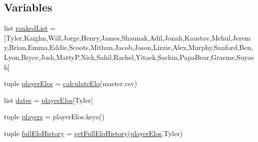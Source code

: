 \subsection*{Variables}
\begin{DoxyCompactItemize}
\item 
list \hyperlink{namespacebump__util_1_1elo_1_1elo__util_ab17f3f7dc79c0595109f66423f82f9e9}{ranked\+List} = \mbox{[}\textquotesingle{}Tyler\textquotesingle{},\textquotesingle{}Kaighn\textquotesingle{},\textquotesingle{}Will\textquotesingle{},\textquotesingle{}Jorge\textquotesingle{},\textquotesingle{}Henry\textquotesingle{},\textquotesingle{}James\textquotesingle{},\textquotesingle{}Shaunak\textquotesingle{},\textquotesingle{}Adil\textquotesingle{},\textquotesingle{}Jonah\textquotesingle{},\textquotesingle{}Kaustav\textquotesingle{},\textquotesingle{}Mehul\textquotesingle{},\textquotesingle{}Jeremy\textquotesingle{},\textquotesingle{}Brian\textquotesingle{},\textquotesingle{}Emma\textquotesingle{},\textquotesingle{}Eddie\textquotesingle{},\textquotesingle{}Scoots\textquotesingle{},\textquotesingle{}Mithun\textquotesingle{},\textquotesingle{}Jacob\textquotesingle{},\textquotesingle{}Jason\textquotesingle{},\textquotesingle{}Lizzie\textquotesingle{},\textquotesingle{}Alex\textquotesingle{},\textquotesingle{}Murphy\textquotesingle{},\textquotesingle{}Sanford\textquotesingle{},\textquotesingle{}Ben\textquotesingle{},\textquotesingle{}Lyon\textquotesingle{},\textquotesingle{}Bryce\textquotesingle{},\textquotesingle{}Josh\textquotesingle{},\textquotesingle{}Matty\+P\textquotesingle{},\textquotesingle{}Nick\textquotesingle{},\textquotesingle{}Sahil\textquotesingle{},\textquotesingle{}Rachel\textquotesingle{},\textquotesingle{}Yitaek\textquotesingle{},\textquotesingle{}Sachin\textquotesingle{},\textquotesingle{}Papa\+Bear\textquotesingle{},\textquotesingle{}Graeme\textquotesingle{},\textquotesingle{}Suyash\textquotesingle{}\mbox{]}
\item 
tuple \hyperlink{namespacebump__util_1_1elo_1_1elo__util_ad86bc16b39f702552f41a83c392584ab}{player\+Elos} = \hyperlink{namespacebump__util_1_1elo_1_1elo__util_a6f5e864e37ad79f2dfb4910f59188102}{calculate\+Elo}(\textquotesingle{}master.\+csv\textquotesingle{})
\item 
list \hyperlink{namespacebump__util_1_1elo_1_1elo__util_a444fb8e398767896cae1b9bdba47aff8}{dates} = \hyperlink{namespacebump__util_1_1elo_1_1elo__util_ad86bc16b39f702552f41a83c392584ab}{player\+Elos}\mbox{[}\textquotesingle{}Tyler\textquotesingle{}\mbox{]}
\item 
tuple \hyperlink{namespacebump__util_1_1elo_1_1elo__util_a15699928188d60536539e4b3acee209d}{players} = player\+Elos.\+keys()
\item 
tuple \hyperlink{namespacebump__util_1_1elo_1_1elo__util_a8f3f6c9505d9bffc58e28f8e6ec1ba4e}{full\+Elo\+History} = \hyperlink{namespacebump__util_1_1elo_1_1elo__util_a07ac56703ceb5594ff35397f7563dcc0}{get\+Full\+Elo\+History}(\hyperlink{namespacebump__util_1_1elo_1_1elo__util_ad86bc16b39f702552f41a83c392584ab}{player\+Elos},\textquotesingle{}Tyler\textquotesingle{})
\end{DoxyCompactItemize}


